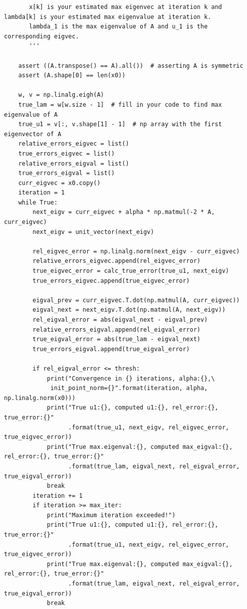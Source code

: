 \documentclass[12pt,twoside]{article}
\begin{document}
\begin{enumerate}
\begin{enumerate}
\begin{verbatim}
       x[k] is your estimated max eigenvec at iteration k and lambda[k] is your estimated max eigenvalue at iteration k.
       lambda_1 is the max eigenvalue of A and u_1 is the corresponding eigvec.
       '''

    assert ((A.transpose() == A).all())  # asserting A is symmetric
    assert (A.shape[0] == len(x0))

    w, v = np.linalg.eigh(A)
    true_lam = w[w.size - 1]  # fill in your code to find max eigenvalue of A
    true_u1 = v[:, v.shape[1] - 1]  # np array with the first eigenvector of A
    relative_errors_eigvec = list()
    true_errors_eigvec = list()
    relative_errors_eigval = list()
    true_errors_eigval = list()
    curr_eigvec = x0.copy()
    iteration = 1
    while True:
        next_eigv = curr_eigvec + alpha * np.matmul(-2 * A, curr_eigvec)
        next_eigv = unit_vector(next_eigv)

        rel_eigvec_error = np.linalg.norm(next_eigv - curr_eigvec)
        relative_errors_eigvec.append(rel_eigvec_error)
        true_eigvec_error = calc_true_error(true_u1, next_eigv)
        true_errors_eigvec.append(true_eigvec_error)

        eigval_prev = curr_eigvec.T.dot(np.matmul(A, curr_eigvec))
        eigval_next = next_eigv.T.dot(np.matmul(A, next_eigv))
        rel_eigval_error = abs(eigval_next - eigval_prev)
        relative_errors_eigval.append(rel_eigval_error)
        true_eigval_error = abs(true_lam - eigval_next)
        true_errors_eigval.append(true_eigval_error)

        if rel_eigval_error <= thresh:
            print("Convergence in {} iterations, alpha:{},\
             init_point_norm={}".format(iteration, alpha, np.linalg.norm(x0)))
            print("True u1:{}, computed u1:{}, rel_error:{}, true_error:{}"
                  .format(true_u1, next_eigv, rel_eigvec_error, true_eigvec_error))
            print("True max.eigenval:{}, computed max_eigval:{}, rel_error:{}, true_error:{}"
                  .format(true_lam, eigval_next, rel_eigval_error, true_eigval_error))
            break
        iteration += 1
        if iteration >= max_iter:
            print("Maximum iteration exceeded!")
            print("True u1:{}, computed u1:{}, rel_error:{}, true_error:{}"
                  .format(true_u1, next_eigv, rel_eigvec_error, true_eigvec_error))
            print("True max.eigenval:{}, computed max_eigval:{}, rel_error:{}, true_error:{}"
                  .format(true_lam, eigval_next, rel_eigval_error, true_eigval_error))
            break


\end{verbatim}
\end{enumerate}
\end{enumerate}
\end{document}
